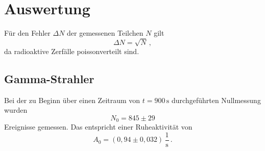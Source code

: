 \section{Auswertung}
\label{sec:Auswertung}
Für den Fehler $\Delta N$ der gemessenen Teilchen $N$ gilt
\begin{equation*}
    \Delta N = \sqrt{N} \,,
\end{equation*}
da radioaktive Zerfälle poissonverteilt sind.

\subsection{Gamma-Strahler}
\label{sec:Gamma-Strahler}



Bei der zu Beginn über einen Zeitraum von $t = 900 \,\unit{\second}$ durchgeführten Nullmessung wurden
\begin{equation*}
    N_0  = 845 \pm 29
\end{equation*}
Ereignisse gemessen.
Das entspricht einer Ruheaktivität von
\begin{equation*}
    A_0 = (0,94 \pm 0,032) \,\dfrac{1}{\unit{\second}} \, .
\end{equation*}

